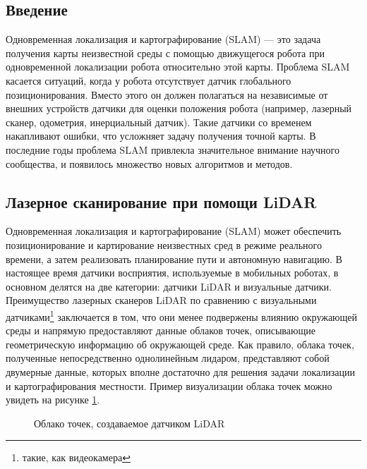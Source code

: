 \documentclass[12pt,a4paper]{scrartcl}
\begin{document}
			\subsection{Введение}
				Одновременная локализация и картографирование (SLAM) — это задача получения карты неизвестной среды с помощью движущегося робота при одновременной локализации робота относительно этой карты. Проблема SLAM касается ситуаций, когда у робота отсутствует датчик глобального позиционирования. Вместо этого он должен полагаться на независимые от внешних устройств датчики для оценки положения робота (например, лазерный сканер, одометрия, инерциальный датчик). Такие датчики со временем накапливают ошибки, что усложняет задачу получения точной карты. В последние годы проблема SLAM привлекла значительное внимание научного сообщества, и появилось множество новых алгоритмов и методов\cite{bib:Thrun2004SimultaneousLA}.
			\subsection{Лазерное сканирование при помощи LiDAR}
				Одновременная локализация и картографирование (SLAM) может обеспечить позиционирование и картирование неизвестных сред в режиме реального времени, а затем реализовать планирование пути и автономную навигацию. В настоящее время датчики восприятия, используемые в мобильных роботах, в основном делятся на две категории: датчики LiDAR и визуальные датчики. Преимущество лазерных сканеров LiDAR по сравнению с визуальными датчиками\footnote{такие, как видеокамера} заключается в том, что они менее подвержены влиянию окружающей среды и напрямую предоставляют данные облаков точек, описывающие геометрическую информацию об окружающей среде. Как правило, облака точек, полученные непосредственно однолинейным лидаром, представляют собой двумерные данные, которых вполне достаточно для решения задачи локализации и картографирования местности\cite{bib:TrajOptimizeLidarSLAM}. Пример визуализации облака точек можно увидеть на рисунке \ref{fig:LiDARExample}.
				
				\begin{figure}[h]
					\caption{Облако точек, создаваемое датчиком LiDAR}
					\label{fig:LiDARExample}
				\end{figure}				
				
\end{document}
